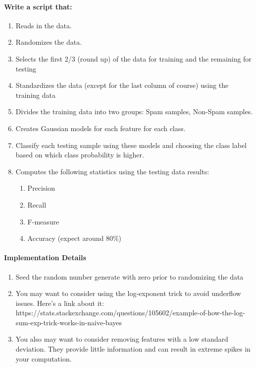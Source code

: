 \documentclass[12pt]{article}
\begin{document}
\noindent
\paragraph{Write a script that:}
\begin{enumerate}
  \item Reads in the data.
  \item Randomizes the data.
  \item Selects the first 2/3 (round up) of the data for training and the remaining for testing
  \item Standardizes the data (except for the last column of course) using the training data
  \item Divides the training data into two groups: Spam samples, Non-Spam samples.
  \item Creates Gaussian models for each feature for each class.
  \item Classify each testing sample using these models and choosing the class label based on which class probability is higher.
  \item Computes the following statistics using the testing data results:
    \begin{enumerate}
        \item Precision
        \item Recall
        \item F-measure
        \item Accuracy (expect around 80\%)
    \end{enumerate}
\end{enumerate}


\paragraph{Implementation Details}
\begin{enumerate}
\item Seed the random number generate with zero prior to randomizing the data
\item You may want to consider using the log-exponent trick to avoid underflow issues.  Here's a link about it:  https://stats.stackexchange.com/questions/105602/example-of-how-the-log-sum-exp-trick-works-in-naive-bayes
\item You also may want to consider removing features with a low standard deviation.  They provide little information and can result in extreme spikes in your computation.
\end{enumerate}
\end{document}
